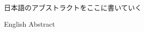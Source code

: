 
\begin{jabstract}
	日本語のアブストラクトをここに書いていく
\end{jabstract}

\begin{eabstract}
	English Abstract
\end{eabstract}